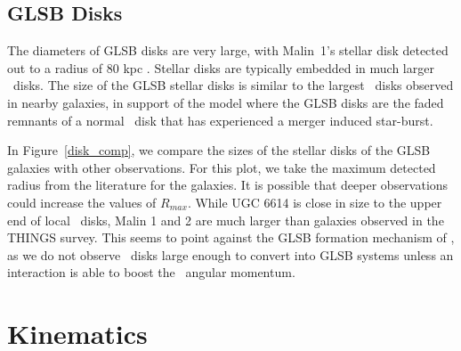 \documentclass{emulateapj}
\newcommand\HI{\ion{H}{1}}
\begin{document}
\subsection{GLSB Disks}\label{sec:disks}

The diameters of GLSB disks are very large, with Malin~1's stellar disk detected out to a radius of 80 kpc \citep{Galaz15}.  Stellar disks are typically embedded in much larger \HI\ disks.  The size of the GLSB stellar disks is similar to the largest \HI\ disks observed in nearby galaxies, in support of the \citet{Mapelli08} model where the GLSB disks are the faded remnants of a normal \HI\ disk that has experienced a merger induced star-burst.  



In Figure~\ref{disk_comp}, we compare the sizes of the stellar disks of the GLSB galaxies with other observations.  For this plot, we take the maximum detected radius from the literature for the galaxies.  It is possible that deeper observations could increase the values of $R_{max}$.  While UGC 6614 is close in size to the upper end of local \HI\ disks, Malin 1 and 2 are much larger than galaxies observed in the THINGS survey.  This seems to point against the GLSB formation mechanism of \citet{Mapelli08}, as we do not observe \HI\ disks large enough to convert into GLSB systems unless an interaction is able to boost the \HI\ angular momentum.

\begin{figure*}
\caption{ Comparison of the GLSB disks with other galaxy disks from the literature.  THINGS data taken from \citet{DeBlok2008}, gLSB \HI\ data from Malin 1 from \citet{Pickering97} and gLSB stellar radii from \citet{Galaz15}, \citet{Kasparova14}, and this paper.  Here, $R_{max}$ is the maximum radius with an \HI\ or optical detection.  For the gLSB galaxies, the solid points show the maximum \HI\ detection radius and stars-shaped points show the maximum detected stellar light radius.  These are all maximum detection radii, and thus should be considered lower limits.   \label{disk_comp}}
\end{figure*}


\section{Kinematics}\label{sec:kinematics}
\end{document}
